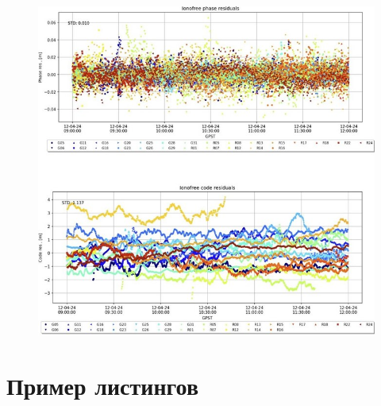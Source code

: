 \begin{figure}[htp]
	\centering
	\includegraphics[width=\linewidth]{images/picC05}
\end{figure}



\chapter{Пример листингов}\label{app:D}

